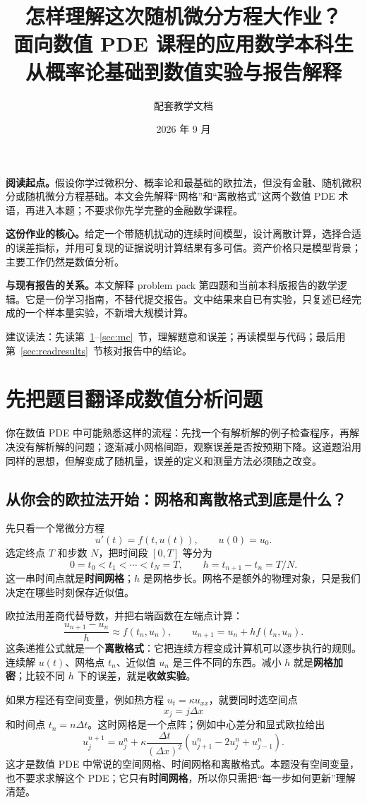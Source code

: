 \documentclass[11pt,a4paper,fontset=none]{ctexart}
\title{怎样理解这次随机微分方程大作业？\\[4pt]
\large 面向数值 PDE 课程的应用数学本科生\\从概率论基础到数值实验与报告解释}
\author{配套教学文档}
\date{2026 年 9 月}
\begin{document}
\maketitle
\noindent\textbf{阅读起点。}假设你学过微积分、概率论和最基础的欧拉法，但没有金融、随机微积分或随机微分方程基础。本文会先解释“网格”和“离散格式”这两个数值 PDE 术语，再进入本题；不要求你先学完整的金融数学课程。

\medskip
\noindent\textbf{这份作业的核心。}给定一个带随机扰动的连续时间模型，设计离散计算，选择合适的误差指标，并用可复现的证据说明计算结果有多可信。资产价格只是模型背景；主要工作仍然是数值分析。

\medskip
\noindent\textbf{与现有报告的关系。}本文解释 problem pack 第四题和当前本科版报告的数学逻辑。它是一份学习指南，不替代提交报告。文中结果来自已有实验，只复述已经完成的一个样本量实验，不新增大规模计算。

\newpage
\tableofcontents
\vfill
\noindent\small 建议读法：先读第~\ref{sec:task}--\ref{sec:mc}~节，理解题意和误差；再读模型与代码；最后用第~\ref{sec:readresults}~节核对报告中的结论。

\newpage
\section{先把题目翻译成数值分析问题}\label{sec:task}
你在数值 PDE 中可能熟悉这样的流程：先找一个有解析解的例子检查程序，再解决没有解析解的问题；逐渐减小网格间距，观察误差是否按预期下降。这道题沿用同样的思想，但解变成了随机量，误差的定义和测量方法必须随之改变。

\subsection*{从你会的欧拉法开始：网格和离散格式到底是什么？}
先只看一个常微分方程
\[
u'(t)=f(t,u(t)),\qquad u(0)=u_0.
\]
选定终点 $T$ 和步数 $N$，把时间段 $[0,T]$ 等分为
\[
0=t_0<t_1<\cdots<t_N=T,\qquad h=t_{n+1}-t_n=T/N.
\]
这一串时间点就是\textbf{时间网格}；$h$ 是网格步长。网格不是额外的物理对象，只是我们决定在哪些时刻保存近似值。

欧拉法用差商代替导数，并把右端函数在左端点计算：
\[
\frac{u_{n+1}-u_n}{h}\approx f(t_n,u_n),
\qquad
u_{n+1}=u_n+h f(t_n,u_n).
\]
这条递推公式就是一个\textbf{离散格式}：它把连续方程变成计算机可以逐步执行的规则。连续解 $u(t)$、网格点 $t_n$、近似值 $u_n$ 是三件不同的东西。减小 $h$ 就是\textbf{网格加密}；比较不同 $h$ 下的误差，就是\textbf{收敛实验}。

如果方程还有空间变量，例如热方程 $u_t=\kappa u_{xx}$，就要同时选空间点
\[
x_j=j\Delta x
\]
和时间点 $t_n=n\Delta t$。这时网格是一个点阵；例如中心差分和显式欧拉给出
\[
u_j^{n+1}=u_j^n+\kappa\frac{\Delta t}{(\Delta x)^2}
\left(u_{j+1}^n-2u_j^n+u_{j-1}^n\right).
\]
这才是数值 PDE 中常说的空间网格、时间网格和离散格式。本题没有空间变量，也不要求求解这个 PDE；它只有\textbf{时间网格}，所以你只需把“每一步如何更新”理解清楚。
\end{document}
